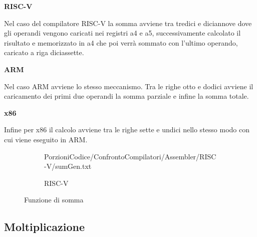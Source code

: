 \documentclass[12pt,a4paper]{report}
\begin{document}
\vspace{0.3 cm}
\textbf{RISC-V}

Nel caso del compilatore RISC-V la somma avviene tra tredici e diciannove dove gli operandi vengono caricati nei registri a4 e a5,  successivamente calcolato il risultato e memorizzato in a4 che poi verrà sommato con l'ultimo operando, caricato a riga diciassette.

\vspace{0.3 cm}
\textbf{ARM}

Nel caso ARM avviene lo stesso meccanismo. Tra le righe otto e dodici avviene il caricamento dei primi due operandi la somma parziale e infine la somma totale.

\vspace{0.3 cm}
\textbf{x86}

Infine per x86 il calcolo avviene tra le righe sette e undici nello stesso modo con cui viene eseguito in ARM.

\begin{figure}[ht]
     
     \begin{subfigure}[b]{0.3\textwidth}
  
         {PorzioniCodice/ConfrontoCompilatori/Assembler/RISC-V/sumGen.txt}
	\label{Code:Add2RISC}
\caption{RISC-V}
     \end{subfigure}
     \hfill
     \begin{subfigure}[b]{0.3\textwidth}
         
          
          \label{Code:Add2ARM}

     \end{subfigure}
     \hfill
     \begin{subfigure}[b]{0.3\textwidth}
         
          
	 
	\label{Code:Add2X86}
     \end{subfigure}
    
        \caption{Funzione di somma}
        \label{Fig:code2}
\end{figure}



\subsection{Moltiplicazione}
\end{document}
